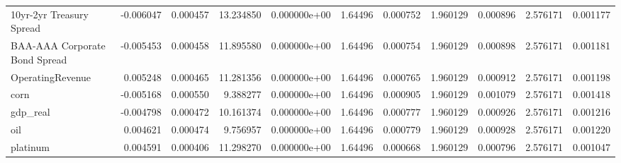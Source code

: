 \documentclass[12pt,a4paper,english]{article}
\begin{document}
{{\begin{tabular}{@{}lrrrrrrrrrr@{}}
			10yr-2yr Treasury Spread      & -0.006047                & 0.000457                    & 13.234850                 & 0.000000e+00                             & 1.64496                       & 0.000752                      & 1.960129                     & 0.000896                     & 2.576171                     & 0.001177                     \\
			BAA-AAA Corporate Bond Spread & -0.005453                & 0.000458                    & 11.895580                 & 0.000000e+00                             & 1.64496                       & 0.000754                      & 1.960129                     & 0.000898                     & 2.576171                     & 0.001181                     \\
			OperatingRevenue              & 0.005248                 & 0.000465                    & 11.281356                 & 0.000000e+00                             & 1.64496                       & 0.000765                      & 1.960129                     & 0.000912                     & 2.576171                     & 0.001198                     \\
			corn                          & -0.005168                & 0.000550                    & 9.388277                  & 0.000000e+00                             & 1.64496                       & 0.000905                      & 1.960129                     & 0.001079                     & 2.576171                     & 0.001418                     \\
			gdp\_real                     & -0.004798                & 0.000472                    & 10.161374                 & 0.000000e+00                             & 1.64496                       & 0.000777                      & 1.960129                     & 0.000926                     & 2.576171                     & 0.001216                     \\
			oil                           & 0.004621                 & 0.000474                    & 9.756957                  & 0.000000e+00                             & 1.64496                       & 0.000779                      & 1.960129                     & 0.000928                     & 2.576171                     & 0.001220                     \\
			platinum                      & 0.004591                 & 0.000406                    & 11.298270                 & 0.000000e+00                             & 1.64496                       & 0.000668                      & 1.960129                     & 0.000796                     & 2.576171                     & 0.001047                     \\

\end{tabular}}}
\end{document}
